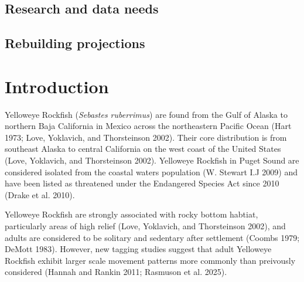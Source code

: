 \documentclass[
]{scrartcl}
\begin{document}
\subsection*{Research and data needs}\label{research-and-data-needs}

\subsection*{Rebuilding projections}\label{rebuilding-projections}

\newpage{}

\newpage{}

\setlength{\parskip}{5mm plus1mm minus1mm}
\setcounter{page}{1}
\setcounter{section}{0}
\renewcommand{\thefigure}{\arabic{figure}}
\renewcommand{\thetable}{\arabic{table}}
\setcounter{table}{0}
\setcounter{figure}{0}

\section{Introduction}\label{introduction}

Yelloweye Rockfish (\emph{Sebastes ruberrimus}) are found from the Gulf
of Alaska to northern Baja California in Mexico across the northeastern
Pacific Ocean (Hart 1973; Love, Yoklavich, and Thorsteinson 2002). Their
core distribution is from southeast Alaska to central California on the
west coast of the United States (Love, Yoklavich, and Thorsteinson
2002). Yelloweye Rockfish in Puget Sound are considered isolated from
the coastal waters population (W. Stewart I.J 2009) and have been listed
as threatened under the Endangered Species Act since 2010 (Drake et al.
2010).

Yelloweye Rockfish are strongly associated with rocky bottom habtiat,
particularly areas of high relief (Love, Yoklavich, and Thorsteinson
2002), and adults are considered to be solitary and sedentary after
settlement (Coombs 1979; DeMott 1983). However, new tagging studies
suggest that adult Yelloweye Rockfish exhibit larger scale movement
patterns more commonly than preivously considered (Hannah and Rankin
2011; Rasmuson et al. 2025).
\end{document}
